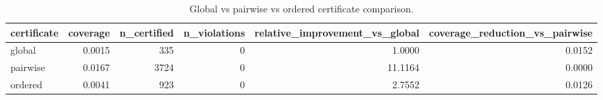 \begin{table}
\caption{Global vs pairwise vs ordered certificate comparison.}
\label{tab:table2_certificate_comparison}
\begin{tabular}{lrrrrr}
\toprule
certificate & coverage & n_certified & n_violations & relative_improvement_vs_global & coverage_reduction_vs_pairwise \\
\midrule
global & 0.0015 & 335 & 0 & 1.0000 & 0.0152 \\
pairwise & 0.0167 & 3724 & 0 & 11.1164 & 0.0000 \\
ordered & 0.0041 & 923 & 0 & 2.7552 & 0.0126 \\
\bottomrule
\end{tabular}
\end{table}
